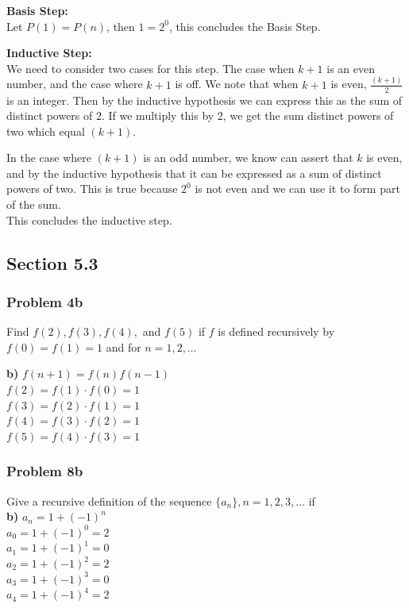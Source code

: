 \documentclass[paper=a4, fontsize=11pt]{scrartcl} %
\begin{document}
\textbf{Basis Step:}\\
Let $P(1) = P(n)$, then $1 = 2^0$,  this concludes the Basis Step.

\textbf{Inductive Step:}\\
We need to consider two cases for this step. The case when $k+1$ is an even number, and the case where $k+1$ is off. We note that when $k+1$ is even, $\frac{(k+1)}{2}$ is an integer. Then by the inductive hypothesis we can express this as the sum of distinct powers of 2. If we multiply this by 2, we get the sum distinct powers of two which equal $(k+1)$.

In the case where $(k+1)$ is an odd number, we know can assert that $k$ is even, and by the inductive hypothesis that it can be expressed as a sum of distinct powers of two. This is true because $2^0$ is not even and we can use it to form part of the sum.\\

This concludes the inductive step.\\ 

\subsection*{Section 5.3}
\subsubsection*{Problem 4b}
Find $f(2), f(3), f(4),$ and $f(5)$ if $f$ is defined recursively
by $f(0) = f(1) = 1$ and for $n = 1, 2, \ldots$

\textbf{b)} $f(n + 1) = f(n)f(n-1)$\\

$f(2) = f(1) \cdot f(0) = 1$\\
$f(3) = f(2) \cdot f(1) = 1$\\
$f(4) = f(3) \cdot f(2) = 1$\\
$f(5) = f(4) \cdot f(3) = 1$\\

\subsubsection*{Problem 8b}
Give a recursive definition of the sequence $\{a_n\}, n = 1, 2, 3, \ldots$ if\\
\textbf{b)} $a_n = 1+(-1)^n$\\

$a_0 = 1 + (-1)^0 = 2 $\\
$a_1 = 1 + (-1)^1 = 0 $\\
$a_2 = 1 + (-1)^2 = 2 $\\
$a_3 = 1 + (-1)^3 = 0 $\\
$a_4 = 1 + (-1)^4 = 2 $\\
\end{document}
